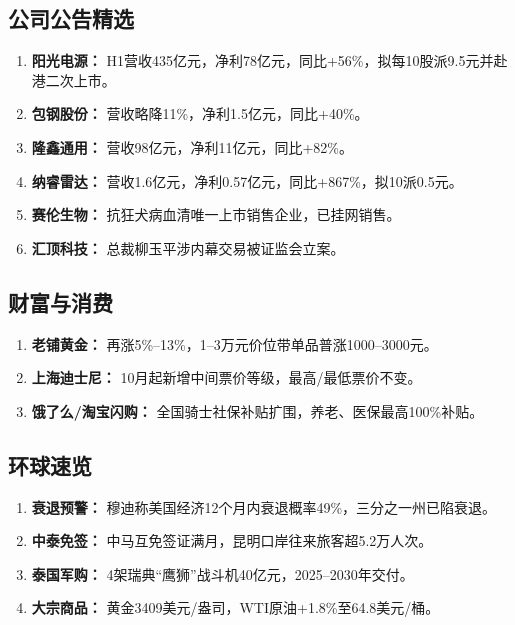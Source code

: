 \subsection{公司公告精选}
\begin{enumerate}[leftmargin=*, nosep]
    \item \textbf{阳光电源：} H1营收435亿元，净利78亿元，同比+56\%，拟每10股派9.5元并赴港二次上市。
    \item \textbf{包钢股份：} 营收略降11\%，净利1.5亿元，同比+40\%。
    \item \textbf{隆鑫通用：} 营收98亿元，净利11亿元，同比+82\%。
    \item \textbf{纳睿雷达：} 营收1.6亿元，净利0.57亿元，同比+867\%，拟10派0.5元。
    \item \textbf{赛伦生物：} 抗狂犬病血清唯一上市销售企业，已挂网销售。
    \item \textbf{汇顶科技：} 总裁柳玉平涉内幕交易被证监会立案。
\end{enumerate}

\subsection{财富与消费}
\begin{enumerate}[leftmargin=*, nosep]
    \item \textbf{老铺黄金：} 再涨5\%–13\%，1–3万元价位带单品普涨1000–3000元。
    \item \textbf{上海迪士尼：} 10月起新增中间票价等级，最高/最低票价不变。
    \item \textbf{饿了么/淘宝闪购：} 全国骑士社保补贴扩围，养老、医保最高100\%补贴。
\end{enumerate}

\subsection{环球速览}
\begin{enumerate}[leftmargin=*, nosep]
    \item \textbf{衰退预警：} 穆迪称美国经济12个月内衰退概率49\%，三分之一州已陷衰退。
    \item \textbf{中泰免签：} 中马互免签证满月，昆明口岸往来旅客超5.2万人次。
    \item \textbf{泰国军购：} 4架瑞典“鹰狮”战斗机40亿元，2025–2030年交付。
    \item \textbf{大宗商品：} 黄金3409美元/盎司，WTI原油+1.8\%至64.8美元/桶。
\end{enumerate}



